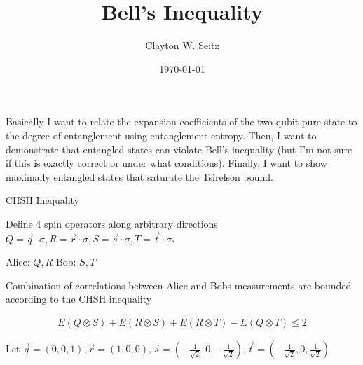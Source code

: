 \documentclass[aspectratio=1610]{beamer}					%
\title{Bell's Inequality}	%
\author{Clayton W. Seitz}								%
\date{\today}									%
\begin{document}
\begin{frame}
  \titlepage
\end{frame}

\begin{frame}{}

Basically I want to relate the expansion coefficients of the two-qubit pure state to the degree of entanglement using entanglement entropy. Then, I want to demonstrate that entangled states can violate Bell's inequality (but I'm not sure if this is exactly correct or under what conditions). Finally, I want to show maximally entangled states that saturate the Tsirelson bound.

\end{frame}

\begin{frame}{CHSH Inequality}

Define 4 spin operators along arbitrary directions $Q = \vec{q}\cdot\sigma, R = \vec{r}\cdot\sigma, S = \vec{s}\cdot\sigma, T = \vec{t}\cdot\sigma$.

\vspace{0.2in}

Alice: $Q,R$
Bob: $S, T$

\vspace{0.1in}
Combination of correlations between Alice and Bobs measurements are bounded according to the CHSH inequality

\begin{align*}
E(Q\otimes S) + E(R\otimes S) + E(R\otimes T) - E(Q\otimes T) \leq 2
\end{align*}

Let $\vec{q} = (0,0,1), \vec{r} = (1,0,0), \vec{s} = (-\frac{1}{\sqrt{2}},0,-\frac{1}{\sqrt{2}}), \vec{t} = (-\frac{1}{\sqrt{2}},0,\frac{1}{\sqrt{2}})$

\end{frame}
\end{document}
